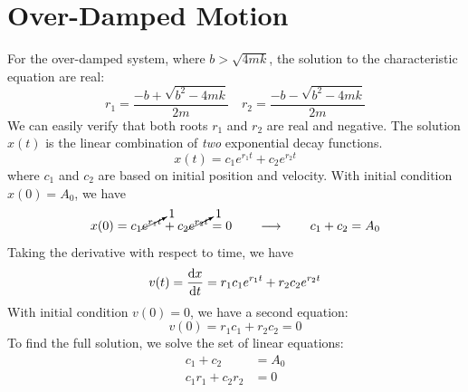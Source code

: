 
\section{Over-Damped Motion}

For the over-damped system, where $b>\sqrt{4mk}$, the solution to the
characteristic equation are real:
\begin{equation*}
  r_1=\frac{-b+\sqrt{b^2-4mk}}{2m}\quad
  r_2=\frac{-b-\sqrt{b^2-4mk}}{2m}
\end{equation*}
We can easily verify that both roots $r_1$ and $r_2$ are real and negative. The
solution $x(t)$ is the linear combination of \emph{two} exponential decay
functions.
\begin{equation}
  x(t)=c_1e^{r_1t}+c_2e^{r_2t}
\end{equation}
where $c_1$ and $c_2$ are based on initial position and velocity.
With initial condition $x(0)=A_0$, we have
\begin{equation}
  x(0)=c_1\cancelto{1}{e^{r_1t}}+c_2\cancelto{1}{e^{r_2t}}=0
  \quad\quad\longrightarrow\quad\quad
  c_1+c_2=A_0
\end{equation}
Taking the derivative with respect to time, we have
\begin{equation}
  v(t)=\diff xt=r_1c_1e^{r_1t}+r_2c_2e^{r_2t}
\end{equation}
With initial condition $v(0)=0$, we have a second equation:
\begin{equation}
  v(0)=r_1c_1+r_2c_2=0
\end{equation}
To find the full solution, we solve the set of linear equations:
\begin{align*}
  c_1 + c_2 &= A_0\\
  c_1r_1 + c_2r_2 &=0
\end{align*}
